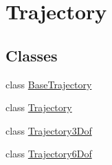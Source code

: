 \hypertarget{group___trajectory}{}\section{Trajectory}
\label{group___trajectory}
\subsection*{Classes}
\begin{DoxyCompactItemize}
\item 
class \hyperlink{group___trajectory_class_base_trajectory}{Base\+Trajectory}
\item 
class \hyperlink{group___trajectory_class_trajectory}{Trajectory}
\item 
class \hyperlink{group___trajectory_class_trajectory3_dof}{Trajectory3\+Dof}
\item 
class \hyperlink{group___trajectory_class_trajectory6_dof}{Trajectory6\+Dof}
\end{DoxyCompactItemize}
